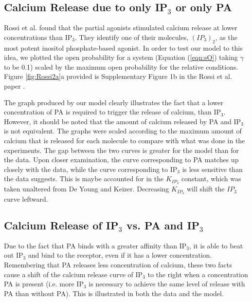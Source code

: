 \documentclass[preprint,12pt]{elsarticle}
\begin{document}
\subsection{Calcium Release due to only IP$_3$ or only PA}
Rossi et al. found that the partial agonists stimulated calcium release at lower concentrations than IP$_3$. They identify one of their molecules, $(IP_3)_2$, as the most potent inositol phosphate-based agonist. In order to test our model to this idea, we plotted the open probability for a system (Equation (\ref{eqn:sO}) taking $\gamma$ to be 0.1) scaled by the maximum open probability for the relative conditions. Figure \ref{fig:Rossi2a}a provided is Supplementary Figure 1b in the Rossi et al. paper \cite{rossi}. 


The graph produced by our model clearly illustrates the fact that a lower concentration of PA is required to trigger the release of calcium, than IP$_3$. However, it should be noted that the amount of calcium released by PA and IP$_3$ is not equivalent. The graphs were scaled according to the maximum amount of calcium that is released for each molecule to compare with what was done in the experiments. The gap between the two curves is greater for the model than for the data. Upon closer examination, the curve corresponding to PA matches up closely with the data, while the curve corresponding to IP$_3$ is less sensitive than the data suggests. This is maybe accounted for in the $K_{IP_3}$ constant, which was taken unaltered from De Young and Keizer. Decreasing $K_{IP_3}$ will shift the $IP_3$ curve leftward. 

\subsection{Calcium Release of IP$_3$ vs. PA and IP$_3$}

Due to the fact that PA binds with a greater affinity than IP$_3$, it is able to beat out IP$_3$ and bind to the receptor, even if it has a lower concentration. Remembering that PA releases less concentration of calcium, these two facts cause a shift of the calcium release curve of IP$_3$ to the right when a concentration PA is present (i.e. more IP$_3$ is necessary to achieve the same level of release with PA than without PA). This is illustrated in both the data and the model.
\end{document}
